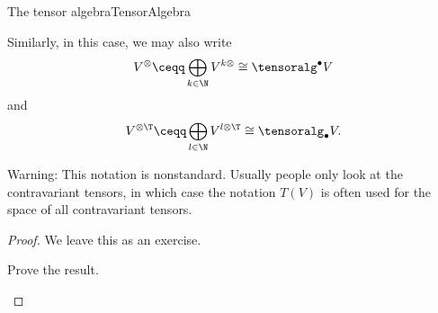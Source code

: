\begin{thm}{The tensor algebra}{TensorAlgebra}
\begin{rmk}
		Similarly, in this case, we may also write
		\begin{equation}
			V^{\otimes}\ceqq \bigoplus _{k\in \N}V^{k\otimes}\cong \tensoralg ^{\bullet}V
		\end{equation}
		and
		\begin{equation}
			V^{\otimes \T}\ceqq \bigoplus _{l\in \N}V^{l\otimes \T}\cong \tensoralg _{\bullet}V.
		\end{equation}
	\end{rmk}
	\begin{rmk}
		Warning:  This notation is nonstandard.  Usually people only look at the contravariant tensors, in which case the notation $T(V)$ is often used for the space of all contravariant tensors.
	\end{rmk}
	\begin{proof}
		We leave this as an exercise.
		\begin{exr}[breakable=false]{}{}
			Prove the result.
		\end{exr}
	\end{proof}
\end{thm}

